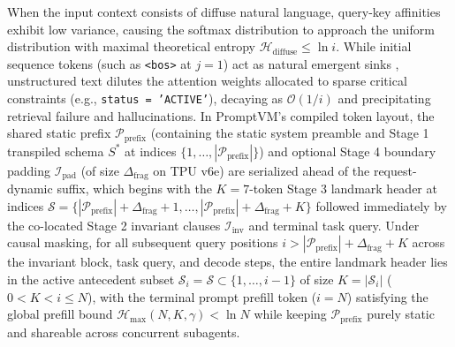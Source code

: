 \documentclass[conference,10pt]{IEEEtran}
\begin{document}
When the input context consists of diffuse natural language, query-key affinities exhibit low variance, causing the softmax distribution to approach the uniform distribution with maximal theoretical entropy $\mathcal{H}_{\text{diffuse}} \le \ln i$. While initial sequence tokens (such as \texttt{<bos>} at $j=1$) act as natural emergent sinks \cite{xiao2023streamingllm}, unstructured text dilutes the attention weights allocated to sparse critical constraints (e.g., \texttt{status = 'ACTIVE'}), decaying as $\mathcal{O}(1/i)$ and precipitating retrieval failure and hallucinations. In PromptVM's compiled token layout, the shared static prefix $\mathcal{P}_{\text{prefix}}$ (containing the static system preamble and Stage 1 transpiled schema $S^*$ at indices $\{1, \dots, |\mathcal{P}_{\text{prefix}}|\}$) and optional Stage 4 boundary padding $\mathcal{I}_{\text{pad}}$ (of size $\Delta_{\text{frag}}$ on TPU v6e) are serialized ahead of the request-dynamic suffix, which begins with the $K=7$-token Stage 3 landmark header at indices $\mathcal{S} = \{|\mathcal{P}_{\text{prefix}}| + \Delta_{\text{frag}} + 1, \dots, |\mathcal{P}_{\text{prefix}}| + \Delta_{\text{frag}} + K\}$ followed immediately by the co-located Stage 2 invariant clauses $\mathcal{I}_{\text{inv}}$ and terminal task query. Under causal masking, for all subsequent query positions $i > |\mathcal{P}_{\text{prefix}}| + \Delta_{\text{frag}} + K$ across the invariant block, task query, and decode steps, the entire landmark header lies in the active antecedent subset $\mathcal{S}_i = \mathcal{S} \subset \{1, \dots, i-1\}$ of size $K = |\mathcal{S}_i|$ ($0 < K < i \le N$), with the terminal prompt prefill token ($i = N$) satisfying the global prefill bound $\mathcal{H}_{\max}(N, K, \gamma) < \ln N$ while keeping $\mathcal{P}_{\text{prefix}}$ purely static and shareable across concurrent subagents.
\end{document}
